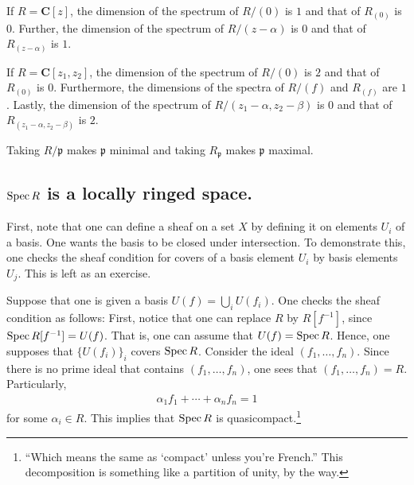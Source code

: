 \documentclass [11 pt, oneside] {article}
\begin{document}
\begin{remark}
	If $R=\mathbf{C}[z]$, the dimension of the spectrum of $R/(0)$ is $1$ and that of $R_{(0)}$ is $0$. Further, the dimension of the spectrum of $R/(z-\alpha)$ is $0$ and that of $R_{(z-\alpha) }$ is $1$.

	If $R=\mathbf{C}[z_1,z_2]$, the dimension of the spectrum of $R/(0)$ is $2$ and that of $R_{(0)}$ is $0$. Furthermore, the dimensions of the spectra of $R/(f)$ and $R_{(f)}$ are $1$. Lastly, the dimension of the spectrum of $R/(z_1-\alpha, z_2-\beta)$ is $0$ and that of $R_{(z_1-\alpha,z_2-\beta)}$ is $2$. 
\end{remark}

\begin{remark}
	Taking $R/\mathfrak{p}$ makes $\mathfrak{p}$ minimal and taking $R_{\mathfrak{p}}$ makes $\mathfrak{p}$ maximal.
\end{remark}

\subsection{\texorpdfstring{$\operatorname{Spec} R$}{Spec R} is a locally ringed space.}
First, note that one can define a sheaf on a set $X$ by defining it on elements $U_i$ of a basis. One wants the basis to be closed under intersection. To demonstrate this, one checks the sheaf condition for covers of a basis element $U_i$ by basis elements $U_j$. This is left as an exercise.

Suppose that one is given a basis $U(f) = \bigcup_ i U(f_i)$. One checks the sheaf condition as follows: First, notice that one can replace $R$ by $R[f^{-1}]$, since $\operatorname{Spec} R[f^{-1}]= U(f)$. That is, one can assume that $U(f) = \operatorname{Spec} R$. Hence, one supposes that $\{U(f_i)\}_i$ covers $\operatorname{Spec} R$. Consider the ideal $(f_1,\hdots, f_n)$. Since there is no prime ideal that contains $(f_1,\hdots, f_n)$, one sees that $(f_1,\hdots, f_n)=R$. Particularly, 
\begin{align*}
	\alpha_1f_1 + \cdots +\alpha_nf_n = 1
\end{align*}
for some $\alpha_i\in R$. This implies that $\operatorname{Spec} R$ is quasicompact.\footnote{``Which means the same as `compact' unless you're French.'' This decomposition is something like a partition of unity, by the way.}
\end{document}
